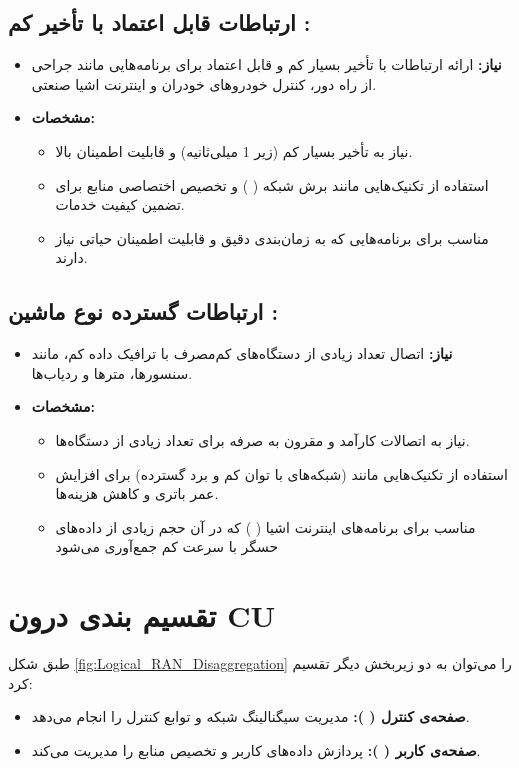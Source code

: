 \documentclass[landscape, 12pt]{report}
\begin{document}
 	\section*{
 	ارتباطات قابل اعتماد با تأخیر کم 
 	:}
 	\begin{itemize}
 		\item \textbf{نیاز:}
 		ارائه ارتباطات با تأخیر بسیار کم و قابل اعتماد برای برنامه‌هایی مانند جراحی از راه دور، کنترل خودروهای خودران و اینترنت اشیا صنعتی.
 		\item \textbf{مشخصات:}
 		\begin{itemize}
 			\item 
نیاز به تأخیر بسیار کم (زیر 1 میلی‌ثانیه) و قابلیت اطمینان بالا.
 			\item 
 استفاده از تکنیک‌هایی مانند برش شبکه (
 ) و تخصیص اختصاصی منابع برای تضمین کیفیت خدمات.
 			\item 
 	مناسب برای برنامه‌هایی که به زمان‌بندی دقیق و قابلیت اطمینان حیاتی نیاز دارند.
 		\end{itemize}
 	\end{itemize}
 	
 	\section*{
 		ارتباطات گسترده نوع ماشین
 		 :}
 	\begin{itemize}
 		\item \textbf{نیاز:}
 		اتصال تعداد زیادی از دستگاه‌های کم‌مصرف با ترافیک داده کم، مانند سنسورها، مترها و ردیاب‌ها.
 		\item \textbf{مشخصات:}
 		\begin{itemize}
 			\item 
 	نیاز به اتصالات کارآمد و مقرون به صرفه برای تعداد زیادی از دستگاه‌ها.
 			\item 
 	استفاده از تکنیک‌هایی مانند
 	  (شبکه‌های با توان کم و برد گسترده) برای افزایش عمر باتری و کاهش هزینه‌ها.
 			\item 
 			مناسب برای برنامه‌های اینترنت اشیا (
 			) که در آن حجم زیادی از داده‌های حسگر با سرعت کم جمع‌آوری می‌شود
 		\end{itemize}
 	\end{itemize}
 	
 	
\chapter*{تقسیم بندی درون CU}
طبق شکل \ref{fig:Logical_RAN_Disaggregation}
 را می‌توان به دو زیربخش دیگر تقسیم کرد:
\begin{itemize}
	\item 
	\textbf{صفحه‌ی کنترل (
	):}
	 مدیریت سیگنالینگ شبکه و توابع کنترل را انجام می‌دهد.
	\item 
	\textbf{صفحه‌ی کاربر (
	): }
	پردازش داده‌های کاربر و تخصیص منابع را مدیریت می‌کند.
\end{itemize}
\end{document}
